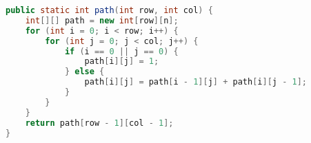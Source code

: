 \begin{table}[H]
	\centering
	\caption{边界情况}
\end{table}


\begin{lstlisting}[language=Java]
public static int path(int row, int col) {
	int[][] path = new int[row][n];
	for (int i = 0; i < row; i++) {
		for (int j = 0; j < col; j++) {
			if (i == 0 || j == 0) {
				path[i][j] = 1;
			} else {
				path[i][j] = path[i - 1][j] + path[i][j - 1];
			}
		}
	}
	return path[row - 1][col - 1];
}
\end{lstlisting}

\newpage

